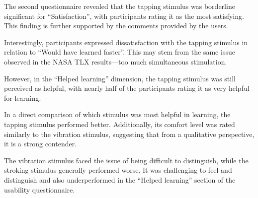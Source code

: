 The second questionnaire revealed that the tapping stimulus was borderline significant for \enquote{Satisfaction}, with participants rating it as the most satisfying. This finding is further supported by the comments provided by the users.

Interestingly, participants expressed dissatisfaction with the tapping stimulus in relation to \enquote{Would have learned faster}. This may stem from the same issue observed in the NASA TLX results—too much simultaneous stimulation.

However, in the \enquote{Helped learning} dimension, the tapping stimulus was still perceived as helpful, with nearly half of the participants rating it as very helpful for learning.

In a direct comparison of which stimulus was most helpful in learning, the tapping stimulus performed better. Additionally, its comfort level was rated similarly to the vibration stimulus, suggesting that from a qualitative perspective, it is a strong contender.

The vibration stimulus faced the issue of being difficult to distinguish, while the stroking stimulus generally performed worse. It was challenging to feel and distinguish and also underperformed in the \enquote{Helped learning} section of the usability questionnaire.








